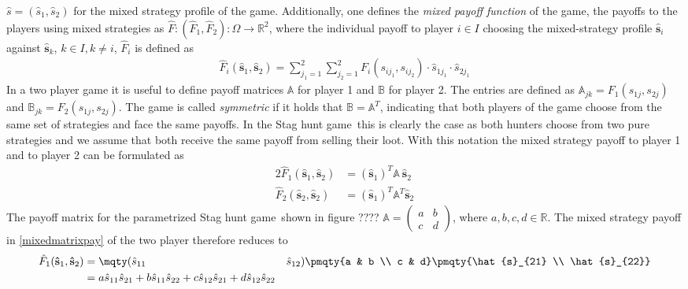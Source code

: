 \documentclass[12pt]{article}
\newcommand{\sthuga}{Stag hunt game}
\newcommand{\realnumb}{\mathbb{R}}
\newcommand{\stu}{s}
\newcommand{\pay}{F}
\newcommand{\sprob}{\hat{s}}
\newcommand{\svec}{\vec{\sprob}}
\renewcommand{\vec}{\mathbf}
\newcommand{\mixpay}{\hat{\pay}}
\newcommand{\mixstratspace}{\Omega}
\newcommand{\payma}{\mathbb{A}}
\begin{document}
$\sprob = \left(\sprob_1,\sprob_2\right)$ for the mixed strategy profile of 
the game. 
Additionally, one defines the \textit{mixed payoff function} of the game,
the payoffs to the players using mixed strategies as 
$\mixpay: (\mixpay_1,\mixpay_2): \mixstratspace \rightarrow \realnumb^2$, 
where the individual payoff to player $i \in I$ choosing the mixed-strategy 
profile $\svec_i$ against $\svec_k$,  $k \in I, k \neq i$, $\mixpay_i$ is 
defined as
\begin{align}
        \mixpay_i(\svec_1,\svec_2) = \sum_{j_{1}=1}^{2} \sum_{j_{2}=1}^{2} 
        \pay_{i}(\stu_{i{j_1}},\stu_{i{j_2}}) \cdot \sprob_{1j_1} \cdot 
        \sprob_{2j_1}
\end{align}
In a two player game it is useful to define payoff matrices $\payma$ for player
1 and $\mathbb{B}$ for player 2. The entries are defined as $\payma_{jk} = 
\pay_1(s_{1j},s_{2j})$ and $\mathbb{B}_{jk} = \pay_2(s_{1j},s_{2j})$. 
The game is called \textit{symmetric} if it holds that $\mathbb{B} = \payma^T$,
indicating that both players of the game choose from the same set of strategies
and face the same payoffs. In the \sthuga\ this is clearly the case as both
hunters choose from two pure strategies and we assume that both receive the
same payoff from selling their loot. 
With this notation the mixed strategy payoff to player 1 and to player 2 can be
formulated as
\begin{alignat}{2}
        \mixpay_1(\svec_1,\svec_2) &= (\svec_1)^T \payma \ \svec_2 \\
        \mixpay_2(\svec_2,\svec_2) &= (\svec_1)^T \payma^T \svec_2
        \label{mixedmatrixpay}
   \end{alignat}
The payoff matrix for the parametrized \sthuga\ shown in figure ???? %
$\payma = \begin{pmatrix} a & b \\ c & d \end{pmatrix}$, where 
$a,b,c,d \in \realnumb$. The mixed strategy payoff in \eqref{mixedmatrixpay}
of the two player therefore reduces to 
\begin{alignat}{2}
        \mixpay_1(\svec_1,\svec_2) &= \mqty(\sprob_{11} & \sprob_{12}) 
        \pmqty{a & b \\ c & d} \pmqty{\sprob_{21} \\ \sprob_{22}}
        \\
        &= a \sprob_{11} \sprob_{21} + b \sprob_{11} \sprob_{22} 
        + c \sprob_{12} \sprob_{21} + d \sprob_{12} \sprob_{22}
\end{alignat}
\end{document}
